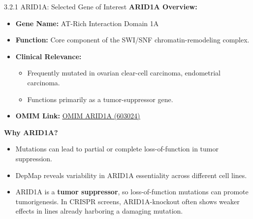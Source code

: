 \documentclass[10pt]{beamer}
\let\oldhref\href
\renewcommand{\href}[2]{\oldhref{#1}{\uline{#2}}}
\begin{document}
\begin{frame}{3.2.1 ARID1A: Selected Gene of Interest}
  \textbf{ARID1A Overview:}
  \begin{itemize}
    \item \textbf{Gene Name:} AT-Rich Interaction Domain 1A
    \item \textbf{Function:} Core component of the SWI/SNF chromatin-remodeling complex.
    \item \textbf{Clinical Relevance:} 
      \begin{itemize}
        \item Frequently mutated in ovarian clear-cell carcinoma, endometrial carcinoma.
        \item Functions primarily as a tumor-suppressor gene.
      \end{itemize}
    \item \textbf{OMIM Link:} \href{https://omim.org/entry/603024}{OMIM ARID1A (603024)}
  \end{itemize}

  \vspace{0.3cm}
  \textbf{Why ARID1A?}
  \begin{itemize}
    \item Mutations can lead to partial or complete loss-of-function in tumor suppression.
    \item DepMap reveals variability in ARID1A essentiality across different cell lines.
    \item ARID1A is a \textbf{tumor suppressor}, so loss-of-function mutations 
can promote tumorigenesis. In CRISPR screens, ARID1A-knockout often shows weaker effects in lines 
already harboring a damaging mutation.
  \end{itemize}
\end{frame}
\end{document}
